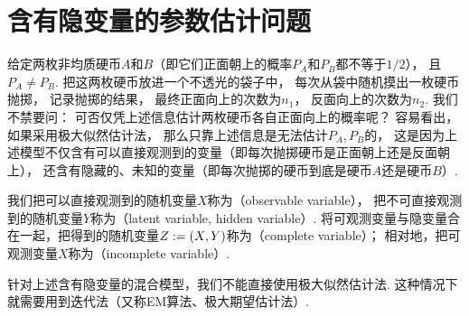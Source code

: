 \section{含有隐变量的参数估计问题}
给定两枚非均质硬币\(A\)和\(B\)（即它们正面朝上的概率\(P_A\)和\(P_B\)都不等于\(1/2\)），
且\(P_A \neq P_B\).
把这两枚硬币放进一个不透光的袋子中，
每次从袋中随机摸出一枚硬币抛掷，
记录抛掷的结果，
最终正面向上的次数为\(n_1\)，
反面向上的次数为\(n_2\).
我们不禁要问：
可否仅凭上述信息估计两枚硬币各自正面向上的概率呢？
容易看出，
如果采用极大似然估计法，
那么只靠上述信息是无法估计\(P_A,P_B\)的，
这是因为上述模型不仅含有可以直接观测到的变量（即每次抛掷硬币是正面朝上还是反面朝上），
还含有隐藏的、未知的变量（即每次抛掷的硬币到底是硬币\(A\)还是硬币\(B\)）.

我们把可以直接观测到的随机变量\(X\)称为（observable variable），
把不可直接观测到的随机变量\(Y\)称为（latent variable, hidden variable）.
将可观测变量与隐变量合在一起，把得到的随机变量\(Z := (X,Y)\)称为（complete variable）；
相对地，把可观测变量\(X\)称为（incomplete variable）.

针对上述含有隐变量的混合模型，我们不能直接使用极大似然估计法.
这种情况下就需要用到迭代法（又称EM算法、极大期望估计法）.

